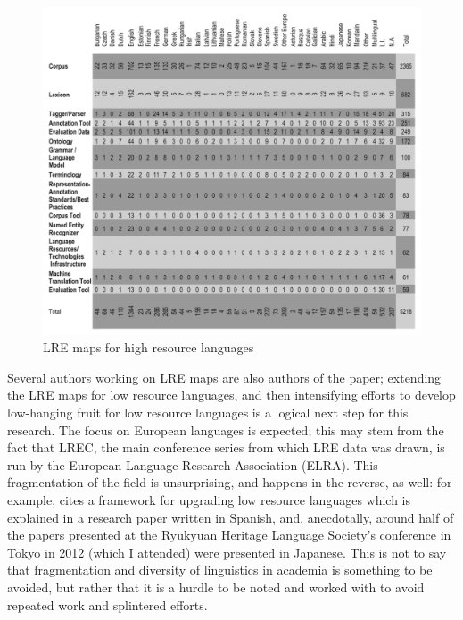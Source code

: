\begin{figure}
 \centering
 \includegraphics[width=1\textwidth]{img/lre.png}
 \caption{LRE maps for high resource languages \citep[460]{mariani2015language}}
 \label{fig:lre}
\end{figure}

Several authors working on LRE maps are also authors of the \citet{soria2017digital} paper; extending the LRE maps for low resource languages, and then intensifying efforts to develop low-hanging fruit for low resource languages is a logical next step for this research. The focus on European languages is expected; this may stem from the fact that LREC, the main conference series from which LRE data was drawn, is run by the European Language Research Association (ELRA). This fragmentation of the field is unsurprising, and happens in the reverse, as well: for example, \citet{paricio2010new} cites a framework for upgrading low resource languages which is explained in a research paper written in Spanish, and, anecdotally, around half of the papers presented at the Ryukyuan Heritage Language Society's conference in Tokyo in 2012 (which I attended) were presented in Japanese. This is not to say that fragmentation and diversity of linguistics in academia is something to be avoided, but rather that it is a hurdle to be noted and worked with to avoid repeated work and splintered efforts.


